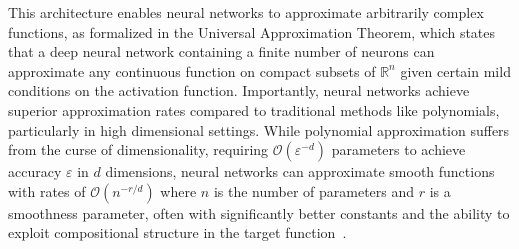             This architecture enables neural networks to approximate arbitrarily complex functions, as formalized in the Universal Approximation Theorem, which states that a deep neural network containing a finite number of neurons can approximate any continuous function on compact subsets of \(\mathbb{R}^n\) given certain mild conditions on the activation function.
            Importantly, neural networks achieve superior approximation rates compared to traditional methods like polynomials, particularly in high dimensional settings.
            While polynomial approximation suffers from the curse of dimensionality, requiring $\mathcal{O}(\varepsilon^{-d})$ parameters to achieve accuracy $\varepsilon$ in $d$ dimensions, neural networks can approximate smooth functions with rates of $\mathcal{O}(n^{-r/d})$ where $n$ is the number of parameters and $r$ is a smoothness parameter, often with significantly better constants and the ability to exploit compositional structure in the target function~\cite{petersen_optimal_2018,lu_expressive_2017}.

        
